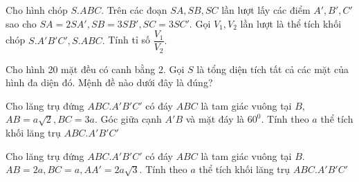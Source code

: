 \begin{ex}%
	Cho hình chóp $S.ABC$. Trên các đoạn $SA, SB, SC$ lần lượt lấy các điểm $A', B', C'$ sao cho $SA = 2SA', SB=3SB', SC = 3SC'.$ Gọi $V_1, V_2$ lần lượt là thể tích khối chóp $S.A'B'C', S.ABC.$ Tính tỉ số $\dfrac{V_1}{V_2}.$
\end{ex}
\begin{ex}%
	Cho hình 20 mặt đều có canh bằng 2. Gọi $S$ là tổng diện tích tất cả các mặt của hình đa diện đó. Mệnh đề nào dưới đây là đúng?
\end{ex}
\begin{ex}%
	Cho lăng trụ đứng $ABC.A'B'C'$ có đáy $ABC$ là tam giác vuông tại $B$, $AB=a\sqrt{2}, BC=3a.$ Góc giữa cạnh $A'B$ và mặt đáy là $60^0.$ Tính theo $a$ thể tích khối lăng trụ $ABC.A'B'C'$
\end{ex}
\begin{ex}%
	Cho lăng trụ đứng $ABC.A'B'C'$ có đáy $ABC$ là tam giác vuông tại $B$. $AB=2a, BC=a, AA'=2a\sqrt{3}.$ Tính theo $a$ thể tích khối lăng trụ $ABC.A'B'C'$
\end{ex}

